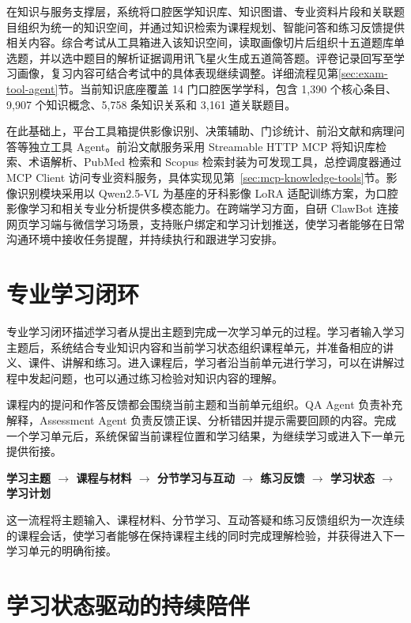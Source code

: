 在知识与服务支撑层，系统将口腔医学知识库、知识图谱、专业资料片段和关联题目组织为统一的知识空间，并通过知识检索为课程规划、智能问答和练习反馈提供相关内容。综合考试从工具箱进入该知识空间，读取画像切片后组织十五道题库单选题，并以选中题目的解析证据调用讯飞星火生成五道简答题。评卷记录回写至学习画像，复习内容可结合考试中的具体表现继续调整。详细流程见第\ref{sec:exam-tool-agent}节。当前知识底座覆盖 14 门口腔医学学科，包含 1,390 个核心条目、9,907 个知识概念、5,758 条知识关系和 3,161 道关联题目。

在此基础上，平台工具箱提供影像识别、决策辅助、门诊统计、前沿文献和病理问答等独立工具 Agent。前沿文献服务采用 Streamable HTTP MCP 将知识库检索、术语解析、PubMed 检索和 Scopus 检索封装为可发现工具，总控调度器通过 MCP Client 访问专业资料服务，具体实现见第~\ref{sec:mcp-knowledge-tools}节。影像识别模块采用以 Qwen2.5-VL 为基座的牙科影像 LoRA 适配训练方案，为口腔影像学习和相关专业分析提供多模态能力。在跨端学习方面，自研 ClawBot 连接网页学习端与微信学习场景，支持账户绑定和学习计划推送，使学习者能够在日常沟通环境中接收任务提醒，并持续执行和跟进学习安排。

\section{专业学习闭环}

专业学习闭环描述学习者从提出主题到完成一次学习单元的过程。学习者输入学习主题后，系统结合专业知识内容和当前学习状态组织课程单元，并准备相应的讲义、课件、讲解和练习。进入课程后，学习者沿当前单元进行学习，可以在讲解过程中发起问题，也可以通过练习检验对知识内容的理解。

课程内的提问和作答反馈都会围绕当前主题和当前单元组织。QA Agent 负责补充解释，Assessment Agent 负责反馈正误、分析错因并提示需要回顾的内容。完成一个学习单元后，系统保留当前课程位置和学习结果，为继续学习或进入下一单元提供衔接。

\begin{center}
  \textbf{学习主题 $\rightarrow$ 课程与材料 $\rightarrow$ 分节学习与互动 $\rightarrow$ 练习反馈 $\rightarrow$ 学习状态 $\rightarrow$ 学习计划}
\end{center}

这一流程将主题输入、课程材料、分节学习、互动答疑和练习反馈组织为一次连续的课程会话，使学习者能够在保持课程主线的同时完成理解检验，并获得进入下一学习单元的明确衔接。

\section{学习状态驱动的持续陪伴}

